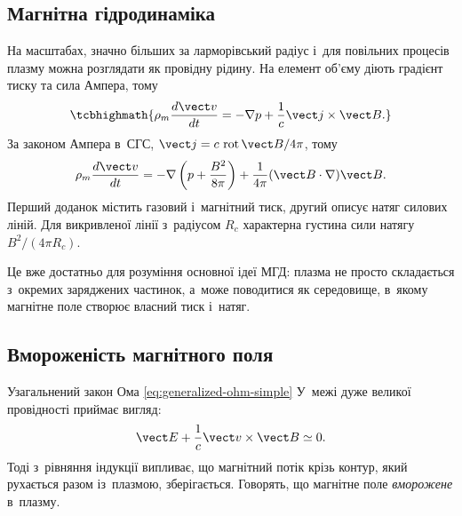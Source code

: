 \subsection*{Магнітна гідродинаміка}



На масштабах, значно більших за ларморівський радіус і~для повільних процесів плазму можна
розглядати як провідну рідину. На елемент об'єму діють градієнт тиску та сила Ампера, тому
\begin{equation}\label{eq:MHD-equation}
	\tcbhighmath{\rho_m\frac{d\vect v}{dt}=-\nabla p+\frac1c\vect j\times\vect B.}
\end{equation}
За законом Ампера в~СГС, $\vect j=c\,\operatorname{rot}\vect B/4\pi$, тому
\begin{equation}\label{eq:MHD-pressure-tension}
	\rho_m\frac{d\vect v}{dt}
	=-\nabla\left(p+\frac{B^2}{8\pi}\right)
	+\frac1{4\pi}(\vect B\cdot\nabla)\vect B.
\end{equation}
Перший доданок містить газовий і~магнітний тиск, другий описує натяг силових ліній. Для
викривленої лінії з~радіусом $R_c$ характерна густина сили натягу $B^2/(4\pi R_c)$.

Це вже достатньо для розуміння основної ідеї МГД: плазма не просто складається з~окремих
заряджених частинок, а~може поводитися як середовище, в~якому магнітне поле створює
власний тиск і~натяг.



\subsection*{Вмороженість магнітного поля}



Узагальнений закон Ома \eqref{eq:generalized-ohm-simple} У~межі дуже великої провідності
приймає вигляд:
\begin{equation*}
	\vect E+\frac1c\vect v\times\vect B\simeq0.
\end{equation*}
Тоді з~рівняння індукції випливає, що магнітний потік крізь контур, який рухається разом
із~плазмою, зберігається. Говорять, що магнітне поле \emph{вморожене} в~плазму.

